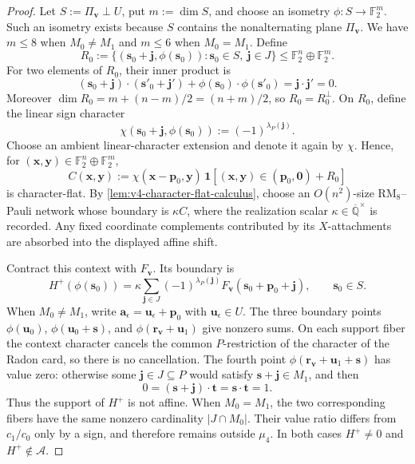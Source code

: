 \documentclass[11pt,letterpaper,onecolumn]{article}
\theoremstyle{plain}
\theoremstyle{definition}
\theoremstyle{remark}
\newcommand{\AlgNums}{\overline{\mathbb Q}}
\newcommand{\Ftwo}{\mathbb F_2}
\newcommand{\cA}{\mathscr A}
\newcommand{\one}{\mathbf 1}
\newcommand{\zero}{\mathbf 0}
\newcommand{\RMcore}{\mathrm{RM}_8}
\begin{document}
\begin{proof}
Let \(S:=\Pi_{\mathbf{v}}\perp U\), put \(m:=\dim S\), and choose an isometry
\(\phi:S\to\Ftwo^m\).  Such an isometry exists because \(S\) contains the
nonalternating plane \(\Pi_{\mathbf{v}}\).  We have \(m\le8\) when \(M_0\ne M_1\) and \(m\le6\) when \(M_0=M_1\).  Define
\[
 R_0:=\{({\mathbf{s}}_0+{\mathbf{j}},\phi({\mathbf{s}}_0)):{\mathbf{s}}_0\in S,\ {\mathbf{j}}\in J\}
 \le\Ftwo^n\oplus\Ftwo^m.
\]
For two elements of \(R_0\), their inner product is
\[
 ({\mathbf{s}}_0+{\mathbf{j}})\cdot({\mathbf{s}}'_0+{\mathbf{j}}')
 +\phi({\mathbf{s}}_0)\cdot\phi({\mathbf{s}}'_0)={\mathbf{j}}\cdot {\mathbf{j}}'=0.
\]
Moreover \(\dim R_0=m+(n-m)/2=(n+m)/2\), so \(R_0=R_0^\perp\).
On \(R_0\), define the linear sign character
\[
 \chi({\mathbf{s}}_0+{\mathbf{j}},\phi({\mathbf{s}}_0)):=(-1)^{\lambda_P({\mathbf{j}})}.
\]
Choose an ambient linear-character extension and denote it again by
\(\chi\).  Hence, for
\(({\mathbf{x}},{\mathbf{y}})\in\Ftwo^n\oplus\Ftwo^m\),
\begin{equation}
 C({\mathbf{x}},{\mathbf{y}}):=\chi({\mathbf{x}}-{\mathbf{p}}_0,{\mathbf{y}})\,
 \one[({\mathbf{x}},{\mathbf{y}})\in({\mathbf{p}}_0,\zero)+R_0]
 \label{eq:v4-localizing-context}
\end{equation}
is character-flat.  By \cref{lem:v4-character-flat-calculus}, choose an \(O(n^2)\)-size
\(\RMcore\)--Pauli network whose boundary
is \(\kappa C\), where the realization scalar
\(\kappa\in\AlgNums^\times\) is recorded.  Any fixed
coordinate complements contributed by its \(X\)-attachments are
absorbed into the displayed affine shift.

Contract this context with \(F_{\mathbf{v}}\).  Its boundary is
\hypertarget{eq:v4-localized-sum}{}
\begin{equation*}
 H^+(\phi({\mathbf{s}}_0))
 =\kappa\sum_{{\mathbf{j}}\in J}(-1)^{\lambda_P({\mathbf{j}})}
   F_{\mathbf{v}}({\mathbf{s}}_0+{\mathbf{p}}_0+{\mathbf{j}}),
 \qquad {\mathbf{s}}_0\in S.
\end{equation*}
When \(M_0\ne M_1\), write
\({\mathbf{a}}_\epsilon={\mathbf{u}}_\epsilon+{\mathbf{p}}_0\) with \({\mathbf{u}}_\epsilon\in U\).  The three boundary
points \(\phi({\mathbf{u}}_0)\), \(\phi({\mathbf{u}}_0+{\mathbf{s}})\), and
\(\phi({\mathbf{r}}_{\mathbf{v}}+{\mathbf{u}}_1)\) give nonzero sums.  On each support fiber the context
character cancels the common \(P\)-restriction of the character of the Radon card, so
there is no cancellation.  The fourth point
\(\phi({\mathbf{r}}_{\mathbf{v}}+{\mathbf{u}}_1+{\mathbf{s}})\) has value zero: otherwise some \({\mathbf{j}}\in J\subseteq P\)
would satisfy \({\mathbf{s}}+{\mathbf{j}}\in M_1\), and then
\[
 0=({\mathbf{s}}+{\mathbf{j}})\cdot {\mathbf{t}}={\mathbf{s}}\cdot {\mathbf{t}}=1.
\]
Thus the support of \(H^+\) is not affine.  When \(M_0=M_1\), the
two corresponding fibers have the same nonzero cardinality
\(|J\cap M_0|\).  Their value ratio differs from \(c_1/c_0\) only by a
sign, and therefore remains outside \(\mu_4\).  In both cases
\(H^+\ne0\) and \(H^+\notin\cA\).


\end{proof}
\end{document}
